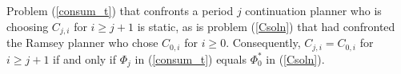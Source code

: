 \documentclass[12pt]{article}
\newcommand{\TS}[1]{{\textcolor{magenta}{#1}}}
\begin{document}
%
%		
%		
%		
%		
%		
%		






\medskip


{Problem   (\ref{consum_t})  that confronts a period $j$ continuation planner who is  choosing $C_{j,i} $ for $i \geq j+1$ is  static, as  is problem  (\ref{Csoln}) that  had confronted the Ramsey planner who chose $C_{0,i}$ for $i \geq 0$.   %
Consequently, $C_{j,i} = C_{0, i} $ for $i \geq j+1$ if and only if $\Phi_j$ in   (\ref{consum_t}) equals $\Phi_0^\ast$ in (\ref{Csoln}).} 


%
\end{document}
